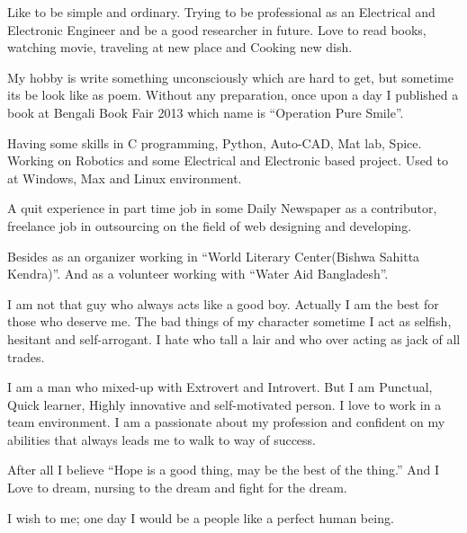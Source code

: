 \documentclass[11pt,a4paper,sans]{moderncv}        %
\begin{document}
\makelettertitle %

Like to be simple and ordinary.
Trying to be professional as an Electrical and Electronic Engineer and be a good researcher in future.
Love to read books, watching movie, traveling at new place and Cooking new dish.

My hobby is write something unconsciously which are hard to get, but sometime its be look like as poem. Without any preparation, once upon a day I published a book at Bengali Book Fair 2013 which name is “Operation Pure Smile”.

Having some skills in C programming, Python, Auto-CAD, Mat lab, Spice.
Working on Robotics and some Electrical and Electronic based project.
Used to at Windows, Max and Linux environment.

A quit experience in part time job in some Daily Newspaper as a contributor, freelance job in outsourcing on the field of web designing and developing.

Besides as an organizer working in “World Literary Center(Bishwa Sahitta Kendra)”. And as a volunteer working with “Water Aid Bangladesh”.

I am not that guy who always acts like a good boy. Actually I am the best for those who deserve me.
The bad things of my character sometime I act as selfish, hesitant and self-arrogant. I hate who tall a lair and who over acting as jack of all trades.

I am a man who mixed-up with Extrovert and Introvert.
But I am Punctual, Quick learner, Highly innovative and self-motivated person. I love to work in a team environment. I am a passionate about my profession and confident on my abilities that always leads me to walk to way of success.

After all I believe “Hope is a good thing, may be the best of the thing.”
And I Love to dream, nursing to the dream and fight for the dream.

I wish to me; one day I would be a people like a perfect human being.


\vspace{0.5cm}


\makeletterclosing %



\nocite{*}

\end{document}

